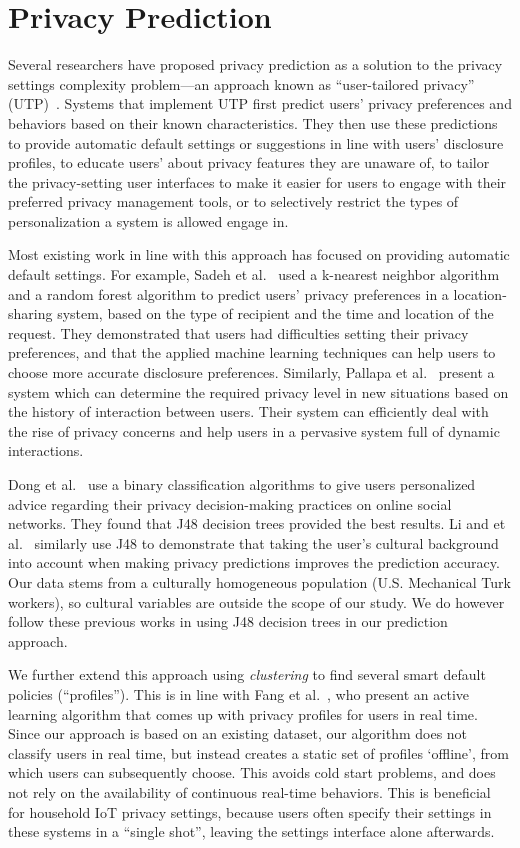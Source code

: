 \section{Privacy Prediction}
Several researchers have proposed privacy prediction as a solution to the privacy settings complexity problem---an approach known as ``user-tailored privacy'' (UTP)~\cite{knijnenburg2017}. Systems that implement UTP first predict users' privacy preferences and behaviors based on their known characteristics. They then use these predictions to provide automatic default settings or suggestions in line with users' disclosure profiles, to educate users' about privacy features they are unaware of, to tailor the privacy-setting user interfaces to make it easier for users to engage with their preferred privacy management tools, or to selectively restrict the types of personalization a system is allowed engage in.

Most existing work in line with this approach has focused on providing automatic default settings. For example, Sadeh et al.~\cite{sadeh2009understanding} used a k-nearest neighbor algorithm and a random forest algorithm to predict users' privacy preferences in a location-sharing system, based on the type of recipient and the time and location of the request. They demonstrated that users had difficulties setting their privacy preferences, and that the applied machine learning techniques can help users to choose more accurate disclosure preferences. Similarly, Pallapa et al.~\cite{pallapa2014adaptive} present a system which can determine the required privacy level in new situations based on the history of interaction between users. Their system can efficiently deal with the rise of privacy concerns and help users in a pervasive system full of dynamic interactions.

Dong et al.~\cite{dong2016ppm} use a binary classification algorithms to give users personalized advice regarding their privacy decision-making practices on online social networks. They found that J48 decision trees provided the best results. Li and et al.~\cite{li2017cross} similarly use J48 to demonstrate that taking the user's cultural background into account when making privacy predictions improves the prediction accuracy. Our data stems from a culturally homogeneous population (U.S. Mechanical Turk workers), so cultural variables are outside the scope of our study. We do however follow these previous works in using J48 decision trees in our prediction approach.

We further extend this approach using \emph{clustering} to find several smart default policies (``profiles''). This is in line with Fang et al.~\cite{fang2010privacy}, who present an active learning algorithm that comes up with privacy profiles for users in real time. Since our approach is based on an existing dataset, our algorithm does not classify users in real time, but instead creates a static set of profiles `offline', from which users can subsequently choose. This avoids cold start problems, and does not rely on the availability of continuous real-time behaviors. This is beneficial for household IoT privacy settings, because users often specify their settings in these systems in a ``single shot'', leaving the settings interface alone afterwards.

